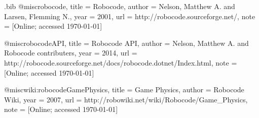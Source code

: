 \begin{filecontents*}{\jobname.bib}
@misc{robocode,
	title		= {Robocode},
	author	= {Nelson, Matthew A. and Larsen, Flemming N.},
	year		= {2001},
	url 		= {http://robocode.sourceforge.net/},
	note		= {[Online; accessed \today]}
}

@misc{robocodeAPI,
	title		= {Robocode API},
	author	= {Nelson, Matthew A. and Robocode contributers},
	year		= {2014},
	url 		= {http://robocode.sourceforge.net/docs/robocode.dotnet/Index.html},
	note		= {[Online; accessed \today]}
}

@misc{wiki:robocodeGamePhysics,
	title		= {Game Physics},
	author	= {Robocode Wiki},
	year		= {2007},
	url 		= {http://robowiki.net/wiki/Robocode/Game\_Physics},
	note		= {[Online; accessed \today]}
}

\end{filecontents*}


\nocite{*}
